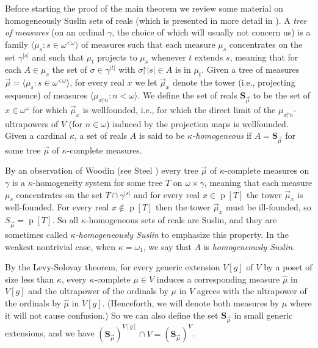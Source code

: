 \documentclass[fleqn, 11pt]{amsart}
\theoremstyle{plain}
\theoremstyle{definition}
\theoremstyle{remark}
\newcommand{\restrict}{\mathord{\restriction}}
\DeclareMathOperator{\p}{p}
\begin{document}
Before starting the proof of the main theorem we review some material on homogeneously Suslin sets of reals (which is presented in more detail in \cite{LarStationaryTower, SteDMT}). A \emph{tree of measures} (on an ordinal $\gamma$, the choice of which will usually not concern us) is a family $\langle\mu_s : s \in \omega^{\mathord{<}\omega}\rangle$ of measures such that each measure $\mu_s$ concentrates on the set $\gamma^{\left|s\right|}$ and such that $\mu_t$ projects to $\mu_s$ whenever $t$ extends $s$, meaning that for each $A \in \mu_{s}$ the set of $\sigma \in \gamma^{|t|}$ with $\sigma \restrict |s| \in A$ is in $\mu_{t}$. Given a tree of measures $\vec{\mu} = \langle \mu_s : s \in \omega^{\mathord{<}\omega}\rangle$, 
for every real $x$ we let $\vec{\mu}_x$ denote the tower (i.e., projecting sequence) of measures $\langle \mu_{x \restrict n} : n<\omega\rangle$. We define the set of reals $\textbf{S}_{\vec{\mu}}$ to be the set of $x \in \omega^\omega$ for which $\vec{\mu}_x$ is wellfounded, i.e., for which the direct limit of the $\mu_{x \restrict n}$-ultrapowers of $V$ (for $n \in \omega$) induced by the projection maps is wellfounded. 
Given a cardinal $\kappa$, a set of reals $A$ is said to be \emph{$\kappa$-homogeneous} if $A = \textbf{S}_{\vec{\mu}}$ for some tree $\vec{\mu}$ of $\kappa$-complete measures.

By an observation of Woodin (see Steel \cite[Proposition~2.5]{SteDMT}) every tree $\vec{\mu}$ of $\kappa$-complete measures on $\gamma$ is a $\kappa$-homogeneity system for some tree $T$ on $\omega \times \gamma$, meaning that each measure $\mu_s$ concentrates on the set $T \cap \gamma^{\left|s\right|}$ and for every real $x \in \p[T]$ the tower $\vec{\mu}_x$ is well-founded. For every real $x \notin \p[T]$ then the tower $\vec{\mu}_x$ must be ill-founded, so $S_{\vec{\mu}} = \p[T]$. So all $\kappa$-homogeneous sets of reals are Suslin, and they are sometimes called \emph{$\kappa$-homogeneously Suslin} to emphasize this property. In the weakest nontrivial case, when $\kappa = \omega_{1}$, we say that $A$ is \emph{homogeneously Suslin}. 

By the Levy-Solovay theorem, for every generic extension $V[g]$ of $V$ by a poset of size less than $\kappa$, every $\kappa$-complete $\mu \in V$ induces a corresponding measure $\hat{\mu}$ in $V[g]$ and the ultrapower of the ordinals by $\mu$ in $V$ agrees with the ultrapower of the ordinals by $\hat{\mu}$ in $V[g]$. (Henceforth, we will denote both measures by $\mu$ where it will not cause confusion.) So we can also define the set $\textbf{S}_{\vec{\mu}}$ in small generic extensions, and we have $(\textbf{S}_{\vec{\mu}})^{V[g]} \cap V = (\textbf{S}_{\vec{\mu}})^V$.
\end{document}
